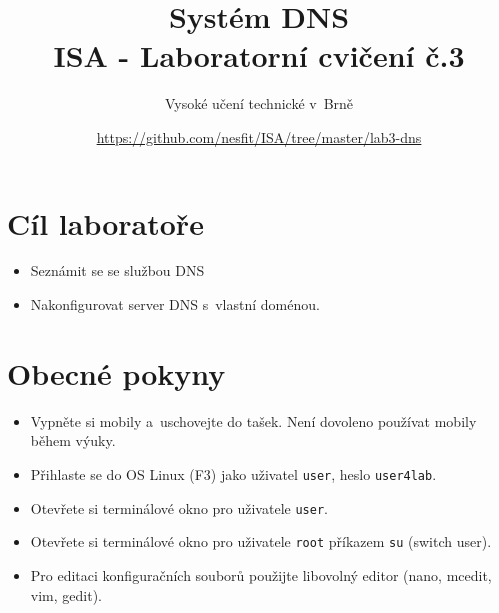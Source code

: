 \documentclass[a4paper,11pt]{article}
\title{Systém DNS\\
{\bf\large ISA - Laboratorní cvičení č.3}}
\author{Vysoké učení technické v~Brně}
\date{\url{https://github.com/nesfit/ISA/tree/master/lab3-dns}}
\begin{document}
{\let\newpage\relax\maketitle}

\section*{Cíl laboratoře}
\begin{itemize}
  \item Seznámit se se službou DNS
  \item Nakonfigurovat server DNS s~vlastní doménou.
\end{itemize}

\section*{Obecné pokyny}
\begin{itemize}
  \item Vypněte si mobily a~uschovejte do tašek. Není dovoleno používat mobily během výuky.
  \item Přihlaste se do OS Linux (F3) jako uživatel {\tt user}, heslo {\tt user4lab}.
  \item Otevřete si terminálové okno pro uživatele {\tt user}.
  \item Otevřete si terminálové okno pro uživatele {\tt root} příkazem {\tt su}
    (switch user).
  \item Pro editaci konfiguračních souborů použijte libovolný editor (nano, mcedit, vim, gedit).
\end{itemize}
\end{document}
